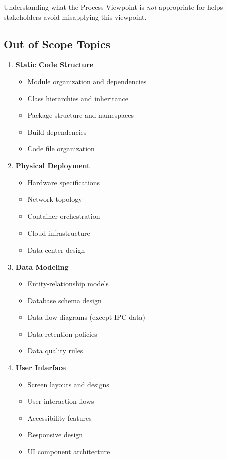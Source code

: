 \documentclass[11pt,letterpaper]{article}
\begin{document}
Understanding what the Process Viewpoint is \emph{not} appropriate for helps stakeholders avoid misapplying this viewpoint.

\subsection{Out of Scope Topics}

\begin{enumerate}[label=\textbf{AC\arabic*:}, leftmargin=2.5em]
    \item \textbf{Static Code Structure}
    \begin{itemize}[nosep]
        \item Module organization and dependencies
        \item Class hierarchies and inheritance
        \item Package structure and namespaces
        \item Build dependencies
        \item Code file organization
    \end{itemize}
    
    \item \textbf{Physical Deployment}
    \begin{itemize}[nosep]
        \item Hardware specifications
        \item Network topology
        \item Container orchestration
        \item Cloud infrastructure
        \item Data center design
    \end{itemize}
    
    \item \textbf{Data Modeling}
    \begin{itemize}[nosep]
        \item Entity-relationship models
        \item Database schema design
        \item Data flow diagrams (except IPC data)
        \item Data retention policies
        \item Data quality rules
    \end{itemize}
    
    \item \textbf{User Interface}
    \begin{itemize}[nosep]
        \item Screen layouts and designs
        \item User interaction flows
        \item Accessibility features
        \item Responsive design
        \item UI component architecture
    \end{itemize}
    

\end{enumerate}
\end{document}
